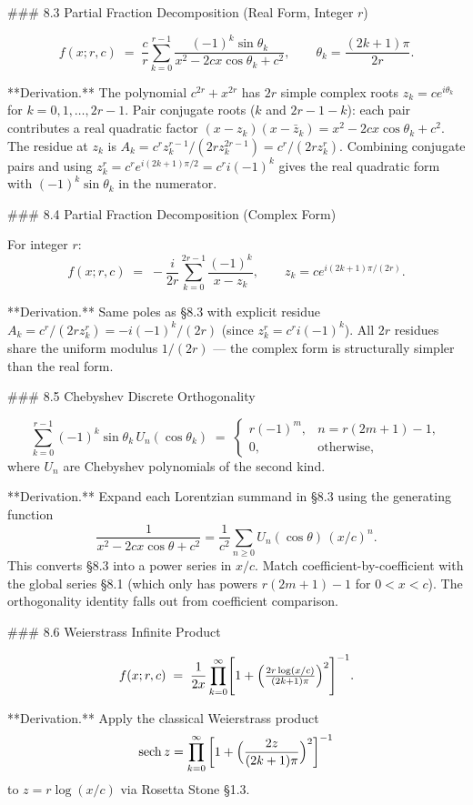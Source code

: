 ### 8.3 Partial Fraction Decomposition (Real Form, Integer $r$)

$$
f(x;r,c) \;=\; \frac{c}{r}\sum_{k=0}^{r-1}\frac{(-1)^{k}\sin\theta_{k}}{x^{2}-2cx\cos\theta_{k}+c^{2}},\qquad \theta_{k} = \frac{(2k+1)\pi}{2r}.
$$

**Derivation.** The polynomial $c^{2r}+x^{2r}$ has $2r$ simple complex roots $z_{k} = ce^{i\theta_{k}}$ for $k=0,1,\ldots,2r-1$. Pair conjugate roots ($k$ and $2r-1-k$): each pair contributes a real quadratic factor $(x-z_{k})(x-\bar z_{k}) = x^{2}-2cx\cos\theta_{k}+c^{2}$. The residue at $z_{k}$ is $A_{k} = c^{r}z_{k}^{r-1}/(2rz_{k}^{2r-1}) = c^{r}/(2rz_{k}^{r})$. Combining conjugate pairs and using $z_{k}^{r} = c^{r}e^{i(2k+1)\pi/2} = c^{r}i(-1)^{k}$ gives the real quadratic form with $(-1)^{k}\sin\theta_{k}$ in the numerator.

### 8.4 Partial Fraction Decomposition (Complex Form)

For integer $r$:
$$
\boxed{\;f(x;r,c) \;=\; -\frac{i}{2r}\sum_{k=0}^{2r-1}\frac{(-1)^{k}}{x-z_{k}},\qquad z_{k} = ce^{i(2k+1)\pi/(2r)}.\;}
$$

**Derivation.** Same poles as §8.3 with explicit residue $A_{k} = c^{r}/(2rz_{k}^{r}) = -i(-1)^{k}/(2r)$ (since $z_{k}^{r} = c^{r}i(-1)^{k}$). All $2r$ residues share the uniform modulus $1/(2r)$ — the complex form is structurally simpler than the real form.

### 8.5 Chebyshev Discrete Orthogonality

$$
\sum_{k=0}^{r-1}(-1)^{k}\sin\theta_{k}\,U_{n}(\cos\theta_{k}) \;=\; \begin{cases}r(-1)^{m}, & n = r(2m+1)-1,\\ 0, & \text{otherwise},\end{cases}
$$
where $U_{n}$ are Chebyshev polynomials of the second kind.

**Derivation.** Expand each Lorentzian summand in §8.3 using the generating function
$$
\frac{1}{x^{2}-2cx\cos\theta+c^{2}} = \frac{1}{c^{2}}\sum_{n\ge 0}U_{n}(\cos\theta)\,(x/c)^{n}.
$$
This converts §8.3 into a power series in $x/c$. Match coefficient-by-coefficient with the global series §8.1 (which only has powers $r(2m+1)-1$ for $0<x<c$). The orthogonality identity falls out from coefficient comparison.

### 8.6 Weierstrass Infinite Product

$$
f(x;r,c) \;=\; \frac{1}{2x}\prod_{k=0}^{\infty}\Biggl[1+\Bigl(\tfrac{2r\log(x/c)}{(2k+1)\pi}\Bigr)^{2}\Biggr]^{-1}.
$$

**Derivation.** Apply the classical Weierstrass product
$$
\operatorname{sech} z = \prod_{k=0}^{\infty}\left[1 + \Bigl(\frac{2z}{(2k+1)\pi}\Bigr)^{2}\right]^{-1}
$$
to $z = r\log(x/c)$ via Rosetta Stone §1.3.

